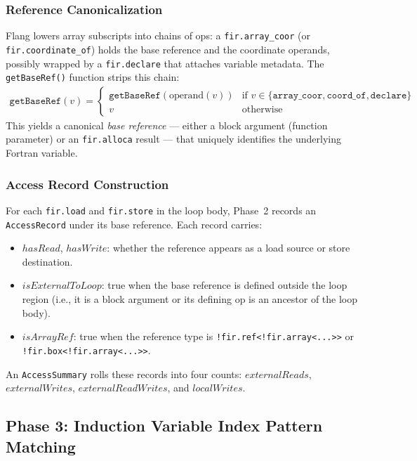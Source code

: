 \documentclass[conference]{IEEEtran}
\begin{document}
\subsubsection{Reference Canonicalization}

Flang lowers array subscripts into chains of ops: a
\texttt{fir.array\_coor} (or \texttt{fir.coordinate\_of}) holds the
base reference and the coordinate operands, possibly wrapped by a
\texttt{fir.declare} that attaches variable metadata.  The
\texttt{getBaseRef()} function strips this chain:
\begin{align}
  \texttt{getBaseRef}(v) = \begin{cases}
    \texttt{getBaseRef}(\text{operand}(v)) & \text{if } v \in
    \{\texttt{array\_coor},\texttt{coord\_of},\texttt{declare}\} \\
    v & \text{otherwise}
  \end{cases}
\end{align}
This yields a canonical \emph{base reference} — either a block
argument (function parameter) or an \texttt{fir.alloca} result —
that uniquely identifies the underlying Fortran variable.

\subsubsection{Access Record Construction}

For each \texttt{fir.load} and \texttt{fir.store} in the loop body,
Phase~2 records an \texttt{AccessRecord} under its base reference.
Each record carries:
\begin{itemize}
  \item $\mathit{hasRead}$, $\mathit{hasWrite}$: whether the reference
        appears as a load source or store destination.
  \item $\mathit{isExternalToLoop}$: true when the base reference is
        defined outside the loop region (i.e., it is a block argument
        or its defining op is an ancestor of the loop body).
  \item $\mathit{isArrayRef}$: true when the reference type is
        \texttt{!fir.ref<!fir.array<...>>} or
        \texttt{!fir.box<!fir.array<...>>}.
\end{itemize}
An \texttt{AccessSummary} rolls these records into four counts:
$\mathit{externalReads}$, $\mathit{externalWrites}$,
$\mathit{externalReadWrites}$, and $\mathit{localWrites}$.

\subsection{Phase 3: Induction Variable Index Pattern Matching}
\end{document}
